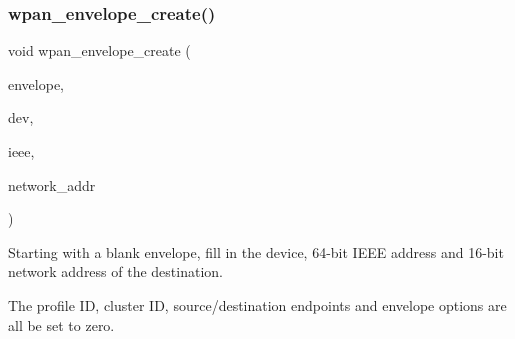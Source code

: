 \subsubsection{\texorpdfstring{wpan\+\_\+envelope\+\_\+create()}{wpan\_envelope\_create()}}
{\footnotesize\ttfamily void wpan\+\_\+envelope\+\_\+create (\begin{DoxyParamCaption}\item[{\hyperlink{structwpan__envelope__t}{wpan\+\_\+envelope\+\_\+t} $\ast$}]{envelope,  }\item[{\hyperlink{structwpan__dev__t}{wpan\+\_\+dev\+\_\+t} $\ast$}]{dev,  }\item[{const \hyperlink{unionaddr64}{addr64} \hyperlink{group__hal_gaef060b3456fdcc093a7210a762d5f2ed}{F\+AR} $\ast$}]{ieee,  }\item[{\hyperlink{group__hal__dos_ga5a8b2dc9e45a9ee81a94ef304fb62505}{uint16\+\_\+t}}]{network\+\_\+addr }\end{DoxyParamCaption})}



Starting with a blank envelope, fill in the device, 64-\/bit I\+E\+EE address and 16-\/bit network address of the destination. 

The profile ID, cluster ID, source/destination endpoints and envelope options are all be set to zero.


